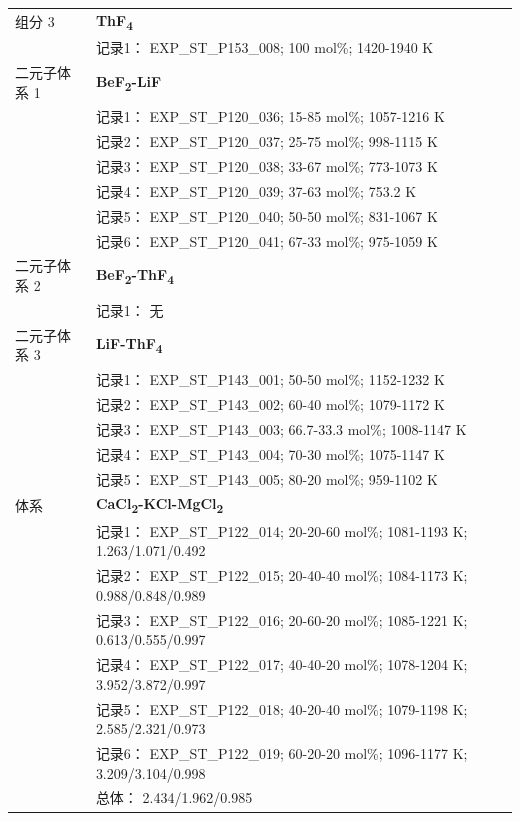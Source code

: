 \documentclass[12pt]{article}
\begin{document}
{\begin{longtable}[]{@{}
  >{\raggedright\arraybackslash}p{}
  >{\raggedright\arraybackslash}p{}@{}}
组分 3  & \textbf{ThF\textsubscript{4}} \\
 & 记录1： EXP\_ST\_P153\_008; 100 mol\%; 1420-1940 K  \\

二元子体系 1  & \textbf{BeF\textsubscript{2}-LiF} \\
 & 记录1： EXP\_ST\_P120\_036; 15-85 mol\%; 1057-1216 K \\
 & 记录2： EXP\_ST\_P120\_037; 25-75 mol\%; 998-1115 K \\
 & 记录3： EXP\_ST\_P120\_038; 33-67 mol\%; 773-1073 K \\
 & 记录4： EXP\_ST\_P120\_039; 37-63 mol\%; 753.2 K \\
 & 记录5： EXP\_ST\_P120\_040; 50-50 mol\%; 831-1067 K \\
 & 记录6： EXP\_ST\_P120\_041; 67-33 mol\%; 975-1059 K  \\

二元子体系 2 & \textbf{BeF\textsubscript{2}-ThF\textsubscript{4}} \\
 & 记录1： 无 \\
二元子体系 3  & \textbf{LiF-ThF\textsubscript{4}} \\
 & 记录1： EXP\_ST\_P143\_001; 50-50 mol\%; 1152-1232 K \\
 & 记录2： EXP\_ST\_P143\_002; 60-40 mol\%; 1079-1172 K \\
 & 记录3： EXP\_ST\_P143\_003; 66.7-33.3 mol\%; 1008-1147 K \\
 & 记录4： EXP\_ST\_P143\_004; 70-30 mol\%; 1075-1147 K \\
 & 记录5： EXP\_ST\_P143\_005; 80-20 mol\%; 959-1102 K  \\

\midrule
体系 & \textbf{CaCl\textsubscript{2}-KCl-MgCl\textsubscript{2}} \\
 & 记录1： EXP\_ST\_P122\_014; 20-20-60 mol\%; 1081-1193 K; 1.263/1.071/0.492 \\
 & 记录2： EXP\_ST\_P122\_015; 20-40-40 mol\%; 1084-1173 K; 0.988/0.848/0.989 \\
 & 记录3： EXP\_ST\_P122\_016; 20-60-20 mol\%; 1085-1221 K; 0.613/0.555/0.997 \\
 & 记录4： EXP\_ST\_P122\_017; 40-40-20 mol\%; 1078-1204 K; 3.952/3.872/0.997 \\
 & 记录5： EXP\_ST\_P122\_018; 40-20-40 mol\%; 1079-1198 K; 2.585/2.321/0.973 \\
 & 记录6： EXP\_ST\_P122\_019; 60-20-20 mol\%; 1096-1177 K; 3.209/3.104/0.998 \\
 & 总体： 2.434/1.962/0.985  \\


\end{longtable}}
\end{document}
